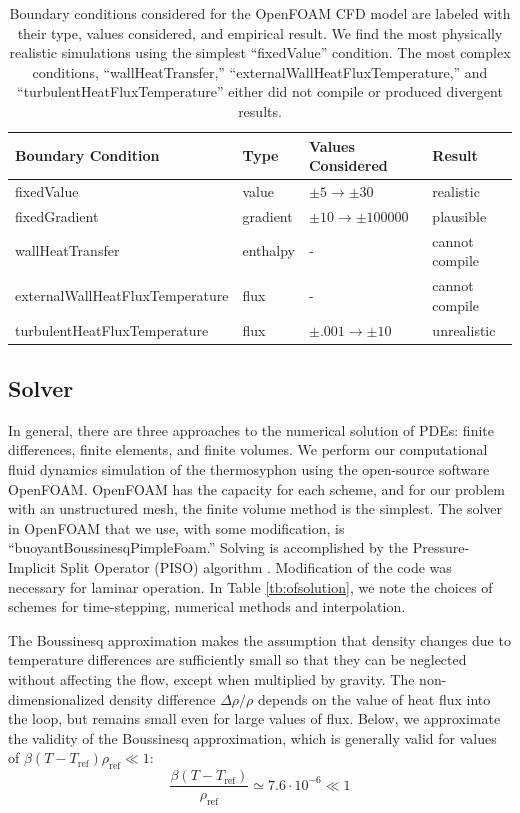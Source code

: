\documentclass[12pt]{report}
\newcommand{\rhoref}{\rho_{\text{ref}}}
\begin{document}
\begin{table}
\begin{tabular}{llll}
\hline
Boundary Condition & Type & Values Considered & Result\\
\hline
\hline
fixedValue & value & $\pm 5 \to \pm 30$ & realistic\\
\hline
fixedGradient & gradient & $\pm 10 \to \pm 100000$ & plausible\\
\hline
wallHeatTransfer & enthalpy & - & cannot compile\\
\hline
externalWallHeatFluxTemperature & flux & - & cannot compile\\
\hline
turbulentHeatFluxTemperature & flux & $\pm .001 \to \pm10$ & unrealistic\\
\hline
\end{tabular}
\label{tb:ofbc}
\caption[Boundary conditions considered for the OpenFOAM CFD model are labeled with their type, values considered, and empirical result]{
  Boundary conditions considered for the OpenFOAM CFD model are labeled with their type, values considered, and empirical result.
  We find the most physically realistic simulations using the simplest ``fixedValue'' condition.
  The most complex conditions, ``wallHeatTransfer,'' ``externalWallHeatFluxTemperature,'' and ``turbulentHeatFluxTemperature'' either did not compile or produced divergent results.
  }
\end{table}

\subsection{Solver}

In general, there are three approaches to the numerical solution of PDEs: finite differences, finite elements, and finite volumes.
We perform our computational fluid dynamics simulation of the thermosyphon using the open-source software OpenFOAM.
OpenFOAM has the capacity for each scheme, and for our problem with an unstructured mesh, the finite volume method is the simplest.
The solver in OpenFOAM that we use, with some modification, is ``buoyantBoussinesqPimpleFoam.''
Solving is accomplished by the Pressure-Implicit Split Operator (PISO) algorithm .
Modification of the code was necessary for laminar operation.
In Table \ref{tb:ofsolution}, we note the choices of schemes for time-stepping, numerical methods and interpolation.

The Boussinesq approximation makes the assumption that density changes due to temperature differences are sufficiently small so that they can be neglected without affecting the flow, except when multiplied by gravity.
The non-dimensionalized density difference $\Delta \rho / \rho$ depends on the value of heat flux into the loop, but remains small even for large values of flux.
Below, we approximate the validity of the Boussinesq approximation, which is generally valid for values of $\beta(T-T_\text{ref})\rhoref \ll 1$:
\begin{equation} \frac{\beta(T - T_\text{ref})}{\rhoref} \simeq 7.6 \cdot 10^{-6} \ll 1 \label{eq:bouss} \end{equation}
\end{document}
